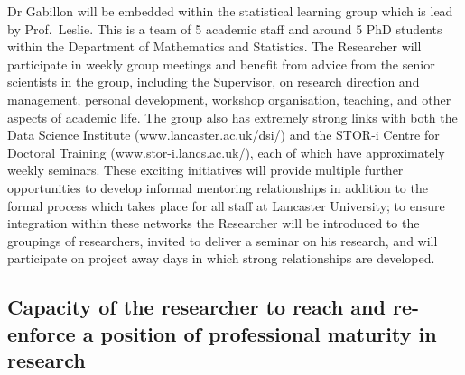 \documentclass[a4paper,11pt]{article}
\begin{document}
Dr Gabillon will be embedded within the statistical learning group which is lead by Prof.\ Leslie.  This is a team of 5 academic staff and around 5 PhD students within the Department of Mathematics and Statistics.  The Researcher will participate in weekly group meetings and benefit from advice from the senior scientists in the group, including the Supervisor, on research direction and management, personal development, workshop organisation, teaching, and other aspects of academic life.  The group also has extremely strong links with both the Data Science Institute (www.lancaster.ac.uk/dsi/) and the STOR-i Centre for Doctoral Training (www.stor-i.lancs.ac.uk/), each of which have approximately weekly seminars.  These exciting initiatives will provide multiple further opportunities to develop informal mentoring relationships in addition to the formal process which takes place for all staff at Lancaster University; to ensure integration within these networks the Researcher will be introduced to the groupings of researchers, invited to deliver a seminar on his research, and will participate on project away days in which strong relationships are developed.


\subsection{Capacity of the researcher to reach and re-enforce a position of professional maturity in research}
\label{sec:maturity}

\end{document}
